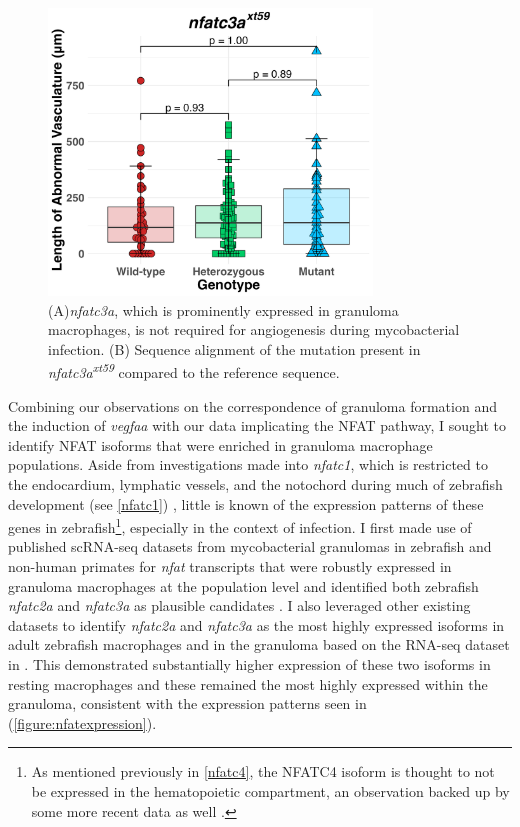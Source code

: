 \begin{figure}
\centering
\includegraphics[height=3in]{images/JB236_nfatc3a_103022.png}
\caption[\textit{nfatc3a} is dispensable for angiogenesis]{(A)\textit{nfatc3a}, which is prominently expressed in granuloma macrophages, is not required for angiogenesis during mycobacterial infection. (B) Sequence alignment of the mutation present in \textit{nfatc3a\textsuperscript{xt59}} compared to the reference sequence.}
\label{figure:nfatc3a}
\end{figure}

Combining our observations on the correspondence of granuloma formation and the induction of \textit{vegfaa} with our data implicating the NFAT pathway, I sought to identify NFAT isoforms that were enriched in granuloma macrophage populations. Aside from investigations made into \textit{nfatc1}, which is restricted to the endocardium, lymphatic vessels, and the notochord during much of zebrafish development (see \autoref{nfatc1}) \citep{Pestel2016, Shin2019, Bagwell2020}, little is known of the expression patterns of these genes in zebrafish\footnote{As mentioned previously in \autoref{nfatc4}, the NFATC4 isoform is thought to not be expressed in the hematopoietic compartment, an observation backed up by some more recent data as well \citep{Peuker2022}.}, especially in the context of infection. I first made use of published scRNA\hyp{}seq datasets from mycobacterial granulomas in zebrafish and non\hyp{}human primates for \textit{nfat} transcripts that were robustly expressed in granuloma macrophages at the population level and identified both zebrafish \textit{nfatc2a} and \textit{nfatc3a} as plausible candidates \citep{Cronan2021, Gideon2022}. I also leveraged other existing datasets to identify \textit{nfatc2a} and \textit{nfatc3a} as the most highly expressed isoforms in adult zebrafish macrophages and in the granuloma based on the RNA-seq dataset in \citet{Cronan2016}. This demonstrated substantially higher expression of these two isoforms in resting macrophages and these remained the most highly expressed within the granuloma, consistent with the expression patterns seen in \citet{Cronan2021} (\autoref{figure:nfatexpression}).

